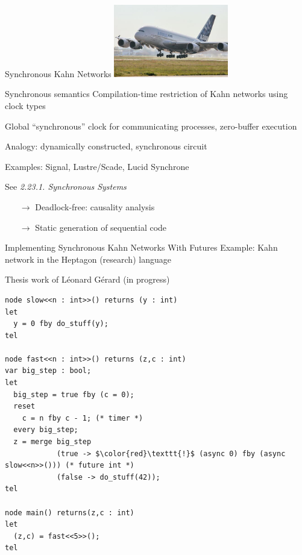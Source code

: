 \documentclass[xcolor=dvipsnames,9pt,mathserif]{beamer}
\renewcommand{\emph}[1]{\alert{#1}}
\begin{document}
\begin{frame}{Synchronous Kahn Networks}
  \hfill\includegraphics[width=5cm]{airbus.jpg}    

  \begin{block}{Synchronous semantics}
    Compilation-time restriction of Kahn networks using \emph{clock types}

    Global ``synchronous'' clock for communicating processes,
    zero-buffer execution

    \medskip
    Analogy: dynamically constructed, synchronous circuit
    
    Examples: \emph{Signal}, \emph{Lustre}/\emph{Scade}, \emph{Lucid Synchrone}

    \medskip
    See \textit{2.23.1. Synchronous Systems}
  \end{block}
  
  \vfill
  \begin{itemize}
  \item[$\to$] \emph{Deadlock-free}: causality analysis
  \item[$\to$] Static \emph{generation of sequential code}
  \end{itemize}
\end{frame}

\begin{frame}[fragile]{Implementing \emph{Synchronous} Kahn Networks With Futures}
  Example: Kahn network in the Heptagon (research) language

  \hfill{\footnotesize Thesis work of Léonard Gérard (in progress)}

  \medskip
\begin{lstlisting}
node slow<<n : int>>() returns (y : int)
let
  y = 0 fby do_stuff(y);
tel

node fast<<n : int>>() returns (z,c : int)
var big_step : bool;
let
  big_step = true fby (c = 0);
  reset
    c = n fby c - 1; (* timer *)
  every big_step;
  z = merge big_step
            (true -> $\color{red}\texttt{!}$ (async 0) fby (async slow<<n>>())) (* future int *)
            (false -> do_stuff(42));
tel

node main() returns(z,c : int)
let
  (z,c) = fast<<5>>();
tel
  \end{lstlisting}
\end{frame}
\end{document}
